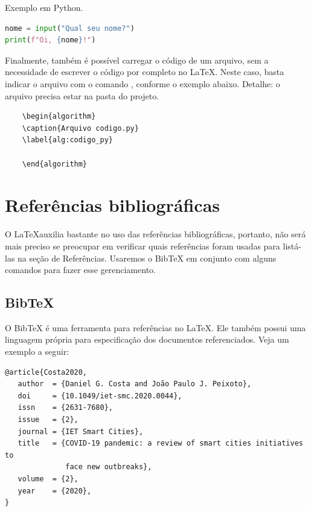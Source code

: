 \begin{algorithm}
\caption{Exemplo em Python.}
\label{alg:python}
\begin{lstlisting}[language=Python]
nome = input("Qual seu nome?")
print(f"Oi, {nome}!")
\end{lstlisting}
\end{algorithm}

Finalmente, também é possível carregar o código de um arquivo, sem a necessidade de escrever o código por completo no \LaTeX. Neste caso, basta indicar o arquivo com o comando \verb==, conforme o exemplo abaixo. Detalhe: o arquivo precisa estar na pasta do projeto.

\begin{verbatim}
    \begin{algorithm}
    \caption{Arquivo codigo.py}
    \label{alg:codigo_py}
    
    \end{algorithm}
\end{verbatim}

\section{Referências bibliográficas}
\label{sec:referencias_bibliograficas}

O \LaTeX\space auxilia bastante no uso das referências bibliográficas, portanto, não será mais preciso se preocupar em verificar quais referências foram usadas para listá-las na seção de Referências. Usaremos o BibTeX em conjunto com alguns comandos para fazer esse gerenciamento.

\subsection{BibTeX}
\label{subsec:bibtex}

O BibTeX é uma ferramenta para referências no \LaTeX. Ele também possui uma linguagem própria para especificação dos documentos referenciados. Veja um exemplo a seguir:

\begin{verbatim}
@article{Costa2020,
   author  = {Daniel G. Costa and João Paulo J. Peixoto},
   doi     = {10.1049/iet-smc.2020.0044},
   issn    = {2631-7680},
   issue   = {2},
   journal = {IET Smart Cities},
   title   = {COVID‐19 pandemic: a review of smart cities initiatives to
              face new outbreaks},
   volume  = {2},
   year    = {2020},
}
\end{verbatim}

